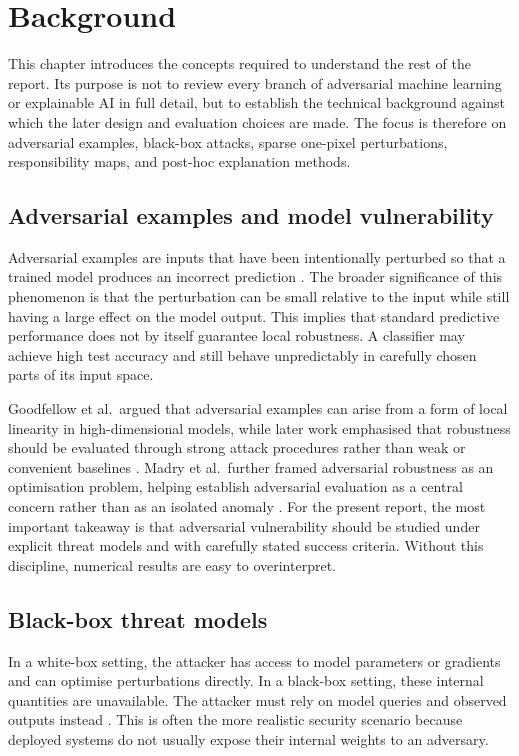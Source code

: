 \section{Background}
\label{sec:background}

This chapter introduces the concepts required to understand the rest of the report.
Its purpose is not to review every branch of adversarial machine learning or explainable AI in full detail, but to establish the technical background against which the later design and evaluation choices are made.
The focus is therefore on adversarial examples, black-box attacks, sparse one-pixel perturbations, responsibility maps, and post-hoc explanation methods.

\subsection{Adversarial examples and model vulnerability}
Adversarial examples are inputs that have been intentionally perturbed so that a trained model produces an incorrect prediction \cite{szegedy2014intriguing,goodfellow2015explaining}.
The broader significance of this phenomenon is that the perturbation can be small relative to the input while still having a large effect on the model output.
This implies that standard predictive performance does not by itself guarantee local robustness.
A classifier may achieve high test accuracy and still behave unpredictably in carefully chosen parts of its input space.

Goodfellow et al.\ argued that adversarial examples can arise from a form of local linearity in high-dimensional models, while later work emphasised that robustness should be evaluated through strong attack procedures rather than weak or convenient baselines \cite{goodfellow2015explaining,carlini2017towards}.
Madry et al.\ further framed adversarial robustness as an optimisation problem, helping establish adversarial evaluation as a central concern rather than as an isolated anomaly \cite{madry2018towards}.
For the present report, the most important takeaway is that adversarial vulnerability should be studied under explicit threat models and with carefully stated success criteria.
Without this discipline, numerical results are easy to overinterpret.

\subsection{Black-box threat models}
In a white-box setting, the attacker has access to model parameters or gradients and can optimise perturbations directly.
In a black-box setting, these internal quantities are unavailable.
The attacker must rely on model queries and observed outputs instead \cite{papernot2017practical}.
This is often the more realistic security scenario because deployed systems do not usually expose their internal weights to an adversary.

